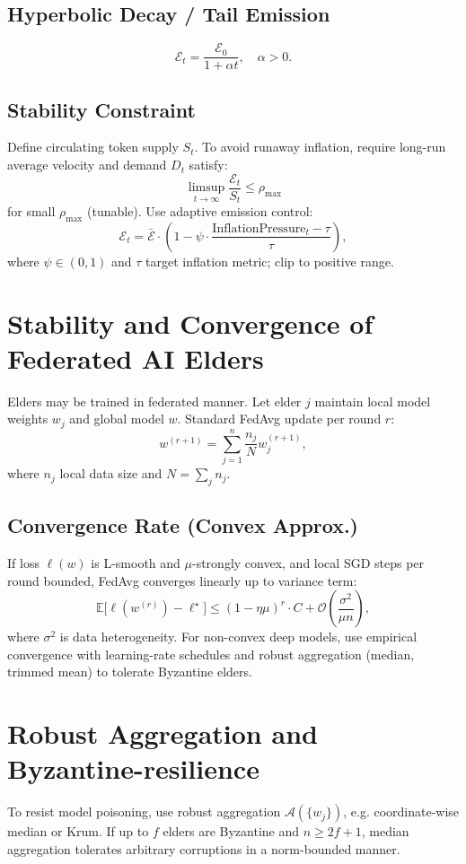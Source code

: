 \documentclass[11pt,a4paper]{article}
\begin{document}
\subsection{Hyperbolic Decay / Tail Emission}
\[
\mathcal{E}_t = \frac{\mathcal{E}_0}{1+\alpha t},\quad \alpha>0.
\]

\subsection{Stability Constraint}
Define circulating token supply \(S_t\). To avoid runaway inflation, require long-run average velocity and demand \(D_t\) satisfy:
\[
\limsup_{t\to\infty} \frac{\mathcal{E}_t}{S_t}\le \rho_{\max}
\]
for small \(\rho_{\max}\) (tunable). Use adaptive emission control:
\[
\mathcal{E}_t = \bar{\mathcal{E}}\cdot \left(1 - \psi\cdot \frac{\mathrm{InflationPressure}_t - \tau}{\tau}\right),
\]
where \(\psi\in(0,1)\) and \(\tau\) target inflation metric; clip to positive range.

\section{Stability and Convergence of Federated AI Elders}

Elders may be trained in federated manner. Let elder \(j\) maintain local model weights \(w_j\) and global model \(w\). Standard FedAvg update per round \(r\):
\[
w^{(r+1)} = \sum_{j=1}^n \frac{n_j}{N} w_j^{(r+1)},
\]
where \(n_j\) local data size and \(N=\sum_j n_j\).

\subsection{Convergence Rate (Convex Approx.)}
If loss \(\ell(w)\) is L-smooth and \(\mu\)-strongly convex, and local SGD steps per round bounded, FedAvg converges linearly up to variance term:
\[
\mathbb{E}\big[\ell(w^{(r)}) - \ell^\star\big] \le \left(1 - \eta\mu\right)^r \cdot C + \mathcal{O}\!\left(\frac{\sigma^2}{\mu n}\right),
\]
where \(\sigma^2\) is data heterogeneity. For non-convex deep models, use empirical convergence with learning-rate schedules and robust aggregation (median, trimmed mean) to tolerate Byzantine elders.

\section{Robust Aggregation and Byzantine-resilience}

To resist model poisoning, use robust aggregation \( \mathcal{A}(\{w_j\})\), e.g. coordinate-wise median or Krum. If up to \(f\) elders are Byzantine and \(n\ge 2f+1\), median aggregation tolerates arbitrary corruptions in a norm-bounded manner.
\end{document}
